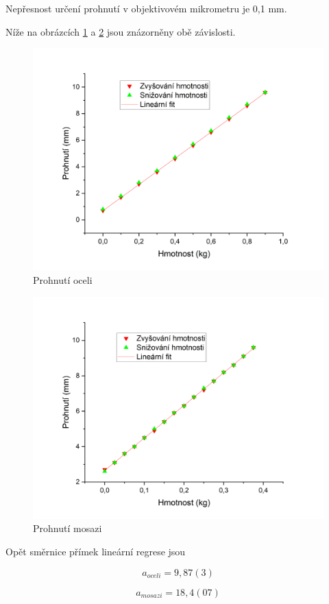 \newpage

Nepřesnost určení prohnutí v objektivovém mikrometru je 0,1 mm.

Níže na obrázcích \ref{fig:prohnuti-oceli} a \ref{fig:prohnuti-mosazi} jsou znázorněny obě závislosti.

\begin{figure}[h]
    \centering
    \includegraphics[width=0.6\linewidth]{09 - Měření modulu pružnosti v tahu//Protokol_modul pružnosti//img/Prohnutí oceli.png}
    \caption{Prohnutí oceli}
    \label{fig:prohnuti-oceli}
\end{figure}

\begin{figure}[h]
    \centering
    \includegraphics[width=0.6\linewidth]{09 - Měření modulu pružnosti v tahu//Protokol_modul pružnosti//img/Prohnutí mosazi.png}
    \caption{Prohnutí mosazi}
    \label{fig:prohnuti-mosazi}
\end{figure}

Opět směrnice přímek lineární regrese jsou

\begin{equation}
    \nonumber
    a_{oceli} = 9,87(3)
\end{equation}

\begin{equation}
    \nonumber
    a_{mosazi} = 18,4(07)
\end{equation}

